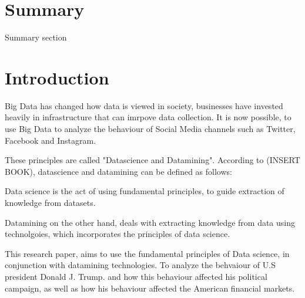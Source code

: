 \documentclass{article}
\begin{document}
\color{NavyBlue} \tableofcontents \color{black}
\thispagestyle{empty} %
 \cleardoublepage
\setcounter{page}{1}%


\cleardoublepage%


\section{Summary} %
Summary section


\cleardoublepage %



















\color{NavyBlue} \section{Introduction} \label{sec:intro}

\color {black}

Big Data has changed how data is viewed in society, businesses have  invested heavily in infrastructure that can imrpove data collection.
It is now possible, to use Big Data to analyze the behaviour of Social Media channels such as Twitter, Facebook and Instagram.


These principles are called "Datascience and Datamining". According to (INSERT BOOK), datascience and datamining can be defined as follows:

Data science is the act of using fundamental principles, to guide extraction of knowledge from datasets.

Datamining on the other hand, deals with extracting knowledge from data using technolgoies, which incorporates the principles of data science. 

This research paper, aims to use the fundamental principles of Data science, in conjunction with  datamining technologies. 
To analyze the behvaiour of U.S president Donald J. Trump. and how this behaviour affected his political campaign, as well as how his behaviour affected the American financial markets.
\end{document}
